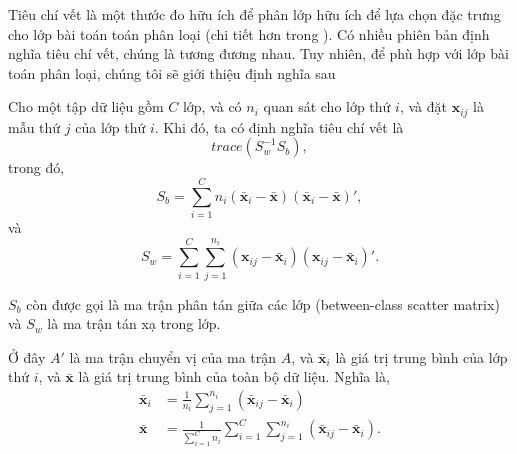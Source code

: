 Tiêu chí vết là một thước đo hữu ích để phân lớp hữu ích để lựa chọn đặc trưng cho lớp bài toán toán phân loại (chi tiết hơn trong  \cite{fukunaga2013introduction,johnson2002applied}). Có nhiều phiên bản định nghĩa tiêu chí vết, chúng là tương đương nhau. Tuy nhiên, để phù hợp với lớp bài toán phân loại, chúng tôi sẽ giới thiệu định nghĩa sau
\begin{definition}
	Cho một tập dữ liệu gồm $C$ lớp, và có $n_i$ quan sát cho lớp thứ $i$, và đặt $\mathbf{x}_{ij}$ là mẫu thứ $j$ của lớp thứ $i$. Khi đó, ta có định nghĩa tiêu chí vết là
	\begin{equation}
		trace(S_w^{-1}S_b),
	\end{equation}
	trong đó, 
	\begin{equation}
		S_b = \sum_{i=1}^Cn_i(\bar{\boldsymbol{x} }_i-\bar{\boldsymbol{x} })(\bar{\boldsymbol{x} }_i-\bar{\boldsymbol{x} })',
	\end{equation}
	và 
	\begin{equation}
		S_w = \sum_{i=1}^C\sum_{j=1}^{n_i}( {\boldsymbol{x}  }_{ij}-\bar{\boldsymbol{x} }_i)({\boldsymbol{x} }_{ij}-\bar{\boldsymbol{x} }_i)'.
	\end{equation}
\end{definition}
$S_b$ còn được gọi là ma trận phân tán giữa các lớp (between-class scatter matrix) và $S_w$ là ma trận tán xạ trong lớp.

Ở đây $A'$ là ma trận chuyển vị của ma trận $A$, và $\bar{\boldsymbol{x}}_i$ là giá trị trung bình của lớp thứ $i$, và $\bar{\boldsymbol{x}}$ là giá trị trung bình của toàn bộ dữ liệu. Nghĩa là,
\begin{align*}
	\bar{\boldsymbol{x}}_i &= \frac{1}{n_i}\sum_{j=1}^{n_i}(\bar{\boldsymbol{x}}_{ij}-\bar{\boldsymbol{x}}_i)\\
	\bar{\boldsymbol{x}} &= \frac{1}{\sum_{i=1}^Cn_i}\sum_{i=1}^C\sum_{j=1}^{n_i}(\bar{\boldsymbol{x}}_{ij}-\bar{\boldsymbol{x}}_i).
\end{align*}

